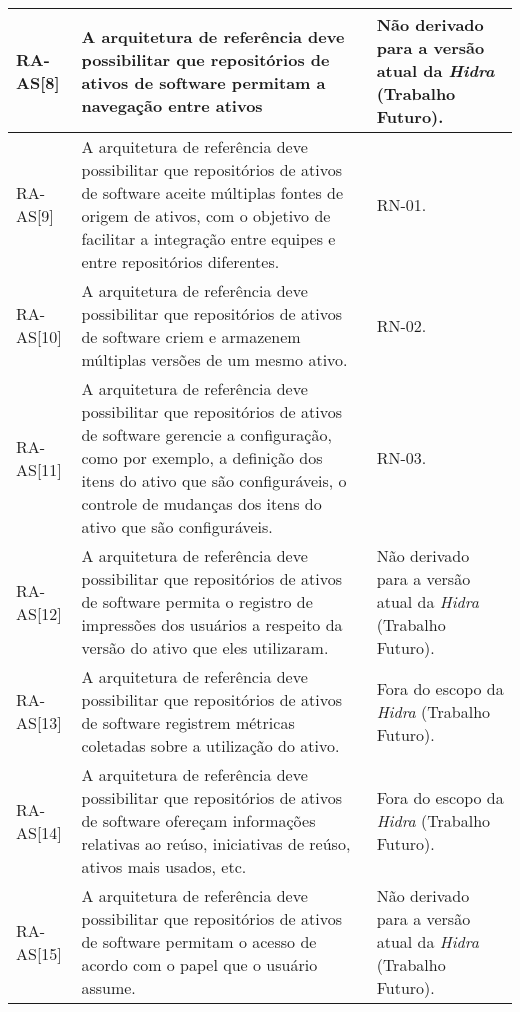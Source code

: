 \begin{longtable}{ | l | p{6cm} | p{6cm} |}
    RA-AS[8] 
    & A arquitetura de referência deve possibilitar que  repositórios de ativos de software permitam a  navegação entre ativos 
    & Não derivado para a versão atual da \textit{Hidra} (Trabalho Futuro). \\ \hline
    
    RA-AS[9] 
    & A arquitetura de referência deve possibilitar que  repositórios de ativos de software aceite múltiplas  fontes de origem de ativos, com o objetivo de facilitar  a integração entre equipes e entre repositórios  diferentes.  
    & RN-01. \\ \hline
 
    RA-AS[10]
    & A arquitetura de referência deve possibilitar que  repositórios de ativos de software criem e armazenem  múltiplas versões de um mesmo ativo.
    & RN-02. \\ \hline
    
    RA-AS[11] 
    & A arquitetura de referência deve possibilitar que  repositórios de ativos de software gerencie a  configuração, como por exemplo, a definição dos itens  do ativo que são configuráveis, o controle de  mudanças dos itens do ativo que são configuráveis.
    & RN-03. \\ \hline
    
    RA-AS[12] 
    &A arquitetura de referência deve possibilitar que  repositórios de ativos de software permita o registro de  impressões dos usuários a respeito da versão do ativo  que eles utilizaram. 
    & Não derivado para a versão atual da \textit{Hidra} (Trabalho Futuro). \\ \hline

    RA-AS[13] 
    & A arquitetura de referência deve possibilitar que  repositórios de ativos de software registrem métricas  coletadas sobre a utilização do ativo.
    & Fora do escopo da \textit{Hidra} (Trabalho Futuro). \\ \hline

    RA-AS[14] 
    & A arquitetura de referência deve possibilitar que  repositórios de ativos de software ofereçam  informações relativas ao reúso, iniciativas de reúso,  ativos mais usados, etc.
    & Fora do escopo da \textit{Hidra} (Trabalho Futuro). \\ \hline
    
    RA-AS[15] 
    & A arquitetura de referência deve possibilitar que  repositórios de ativos de software permitam o acesso de acordo com o papel que o usuário assume.
    & Não derivado para a versão atual da \textit{Hidra} (Trabalho Futuro). \\ \hline
    

\end{longtable}
